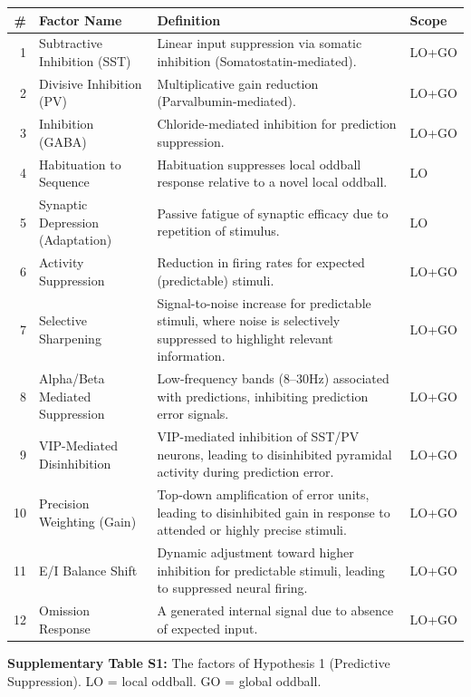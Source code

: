 \documentclass[12pt]{article}
\providecommand{\DIFaddbegin}{} %
\providecommand{\DIFaddend}{} %
\providecommand{\DIFaddincludegraphics}[2][]{{\color{blue}\fbox{\DIFOincludegraphics[#1]{#2}}}} %
\DeclareRobustCommand{\DIFaddbegin}{\DIFOaddbegin \let\includegraphics\DIFaddincludegraphics} %
\DeclareRobustCommand{\DIFaddend}{\DIFOaddend \let\includegraphics\DIFOincludegraphics} %
\begin{document}
\noindent\begin{tabularx}{\textwidth}{@{}r p{1.6in} >{\raggedright\arraybackslash}X l@{}}
\toprule
\textbf{\#} & \textbf{Factor Name} & \textbf{Definition} & \textbf{Scope} \\
\midrule
1 & Subtractive Inhibition (SST) & Linear input suppression via somatic inhibition (Somatostatin-mediated). & LO+GO \\
2 & Divisive Inhibition (PV) & Multiplicative gain reduction (Parvalbumin-mediated). & LO+GO \\
3 & Inhibition (GABA) & Chloride-mediated inhibition for prediction suppression. & LO+GO \\
4 & Habituation to Sequence & Habituation suppresses local oddball response relative to a novel local oddball. & LO \\
5 & Synaptic Depression (Adaptation) & Passive fatigue of synaptic efficacy due to repetition of stimulus. & LO \\
6 & Activity Suppression & Reduction in firing rates for expected (predictable) stimuli. & LO+GO \\
7 & Selective Sharpening & Signal-to-noise increase for predictable stimuli, where noise is selectively suppressed to highlight relevant information. & LO+GO \\
8 & Alpha/Beta Mediated Suppression & Low-frequency bands (8--30Hz) associated with predictions, inhibiting prediction error signals. & LO+GO \\
9 & VIP-Mediated Disinhibition & VIP-mediated inhibition of SST/PV neurons, leading to disinhibited pyramidal activity during prediction error. & LO+GO \\
10 & Precision Weighting (Gain) & Top-down amplification of error units, leading to disinhibited gain in response to attended or highly precise stimuli. & LO+GO \\
11 & E/I Balance Shift & Dynamic adjustment toward higher inhibition for predictable stimuli, leading to suppressed neural firing. & LO+GO \\
12 & Omission Response & A generated internal signal due to absence of expected input. & LO+GO \\
\bottomrule
\end{tabularx}
\endgroup
\vspace{0.4em}
\DIFaddend 

\DIFaddbegin \noindent\DIFaddend \textbf{Supplementary Table S1:} The factors of Hypothesis 1 (Predictive Suppression). LO = local oddball. GO = global oddball.
\end{document}
